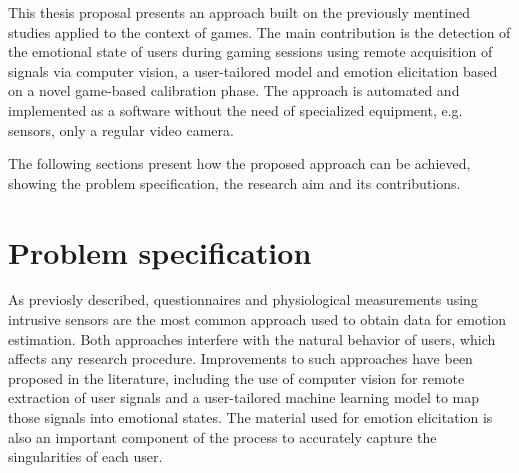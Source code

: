 This thesis proposal presents an approach built on the previously mentined studies applied to the context of games. The main contribution is the detection of the emotional state of users during gaming sessions using remote acquisition of signals via computer vision, a user-tailored model and emotion elicitation based on a novel game-based calibration phase. The approach is automated and implemented as a software without the need of specialized equipment, e.g. sensors, only a regular video camera.


The following sections present how the proposed approach can be achieved, showing the problem specification, the research aim and its contributions.

\section{Problem specification}

As previosly described, questionnaires and physiological measurements using intrusive sensors are the most common approach used to obtain data for emotion estimation. Both approaches interfere with the natural behavior of users, which affects any research procedure. Improvements to such approaches have been proposed in the literature, including the use of computer vision for remote extraction of user signals and a user-tailored machine learning model to map those signals into emotional states. The material used for emotion elicitation is also an important component of the process to accurately capture the singularities of each user.

